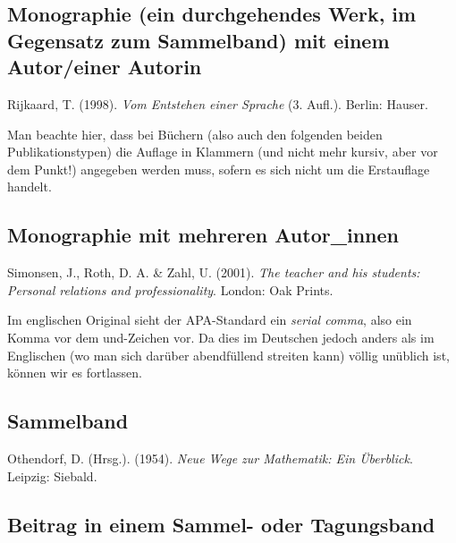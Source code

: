 \documentclass[ngerman,oneside,12pt,a4paper]{scrbook}
\begin{document}
\subsection*{Monographie (ein durchgehendes Werk, im Gegensatz zum
Sammelband) mit einem Autor/einer
Autorin}\label{monographie-ein-durchgehendes-werk-im-gegensatz-zum-sammelband-mit-einem-autoreiner-autorin}

Rijkaard, T. (1998). \emph{Vom Entstehen einer
Sprache} (3. Aufl.). Berlin: Hauser.

Man beachte hier, dass bei Büchern (also auch den folgenden beiden
Publikationstypen) die Auflage in Klammern (und nicht mehr kursiv, aber
vor dem Punkt!) angegeben werden muss, sofern es sich nicht um die
Erstauflage handelt.

\subsection*{Monographie mit mehreren
Autor\_innen}\label{monographie-mit-mehreren-autor_innen}

Simonsen, J., Roth, D. A. \& Zahl, U. (2001).
\emph{The teacher and his students: Personal relations and
professionality}. London: Oak Prints.

Im englischen Original sieht der APA-Standard ein \emph{serial comma},
also ein Komma vor dem und-Zeichen vor. Da dies im Deutschen jedoch
anders als im Englischen (wo man sich darüber abendfüllend streiten
kann) völlig unüblich ist, können wir es fortlassen.

\subsection*{Sammelband}\label{sammelband}

Othendorf, D. (Hrsg.). (1954). \emph{Neue Wege zur
Mathematik: Ein Überblick}. Leipzig: Siebald.

\subsection*{Beitrag in einem Sammel- oder
Tagungsband}\label{beitrag-in-einem-sammel--oder-tagungsband}
\end{document}
